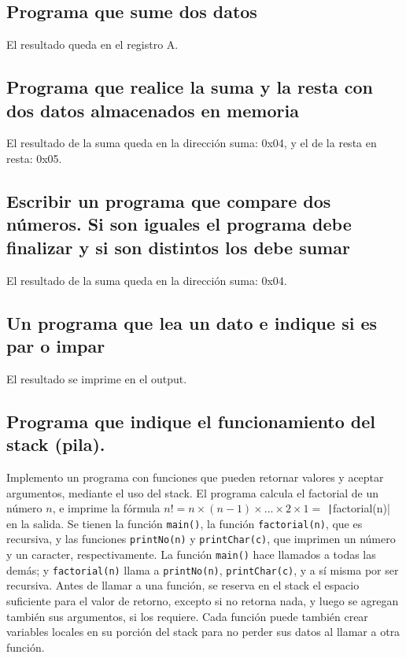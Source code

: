 \documentclass{article}
\begin{document}


\setcounter{section}{1}
\subsection{Programa que sume dos datos}
El resultado queda en el registro A.

\subsection{Programa que realice la suma y la resta con dos datos almacenados en memoria}
El resultado de la suma queda en la dirección suma: 0x04, y el de la resta en resta: 0x05.

\subsection{Escribir un programa que compare dos números. Si son iguales el programa debe finalizar y si son distintos los debe sumar}
El resultado de la suma queda en la dirección suma: 0x04.

\subsection{Un programa que lea un dato e indique si es par o impar}
El resultado se imprime en el output.

\subsection{Programa que indique el funcionamiento del stack (pila).}
Implemento un programa con funciones que pueden retornar valores y aceptar argumentos, mediante el uso del stack. El programa calcula el factorial de un número $n$, e imprime la fórmula $n! = n \times (n-1) \times \dots \times 2 \times 1 =$ \texttt|factorial(n)| en la salida. Se tienen la función \texttt{main()}, la función \texttt{factorial(n)}, que es recursiva, y las funciones \texttt{printNo(n)} y \texttt{printChar(c)}, que imprimen un número y un caracter, respectivamente. La función \texttt{main()} hace llamados a todas las demás; y \texttt{factorial(n)} llama a \texttt{printNo(n)}, \texttt{printChar(c)}, y a sí misma por ser recursiva. 
Antes de llamar a una función, se reserva en el stack el espacio suficiente para el valor de retorno, excepto si no retorna nada, y luego se agregan también sus argumentos, si los requiere. Cada función puede también crear variables locales en su porción del stack para no perder sus datos al llamar a otra función.
\pagebreak
{}
\pagebreak
{}
\end{document}
